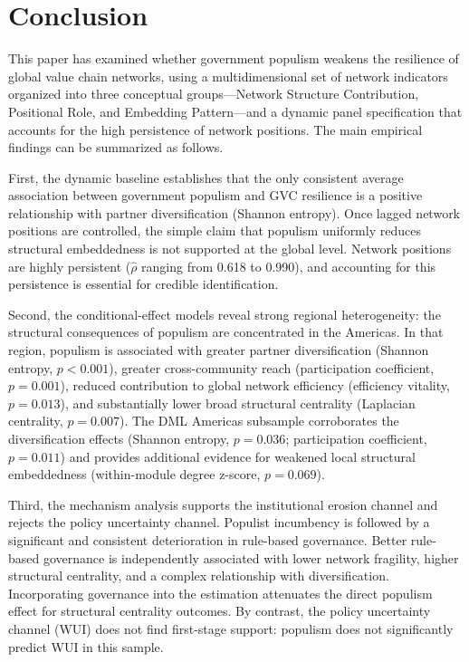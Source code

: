 \documentclass[12pt]{article}
\begin{document}
\section{Conclusion}

This paper has examined whether government populism weakens the resilience of global value chain networks, using a multidimensional set of network indicators organized into three conceptual groups---Network Structure Contribution, Positional Role, and Embedding Pattern---and a dynamic panel specification that accounts for the high persistence of network positions. The main empirical findings can be summarized as follows.

First, the dynamic baseline establishes that the only consistent average association between government populism and GVC resilience is a positive relationship with partner diversification (Shannon entropy). Once lagged network positions are controlled, the simple claim that populism uniformly reduces structural embeddedness is not supported at the global level. Network positions are highly persistent ($\hat{\rho}$ ranging from 0.618 to 0.990), and accounting for this persistence is essential for credible identification.

Second, the conditional-effect models reveal strong regional heterogeneity: the structural consequences of populism are concentrated in the Americas. In that region, populism is associated with greater partner diversification (Shannon entropy, $p < 0.001$), greater cross-community reach (participation coefficient, $p = 0.001$), reduced contribution to global network efficiency (efficiency vitality, $p = 0.013$), and substantially lower broad structural centrality (Laplacian centrality, $p = 0.007$). The DML Americas subsample corroborates the diversification effects (Shannon entropy, $p = 0.036$; participation coefficient, $p = 0.011$) and provides additional evidence for weakened local structural embeddedness (within-module degree z-score, $p = 0.069$).

Third, the mechanism analysis supports the institutional erosion channel and rejects the policy uncertainty channel. Populist incumbency is followed by a significant and consistent deterioration in rule-based governance. Better rule-based governance is independently associated with lower network fragility, higher structural centrality, and a complex relationship with diversification. Incorporating governance into the estimation attenuates the direct populism effect for structural centrality outcomes. By contrast, the policy uncertainty channel (WUI) does not find first-stage support: populism does not significantly predict WUI in this sample.
\end{document}
